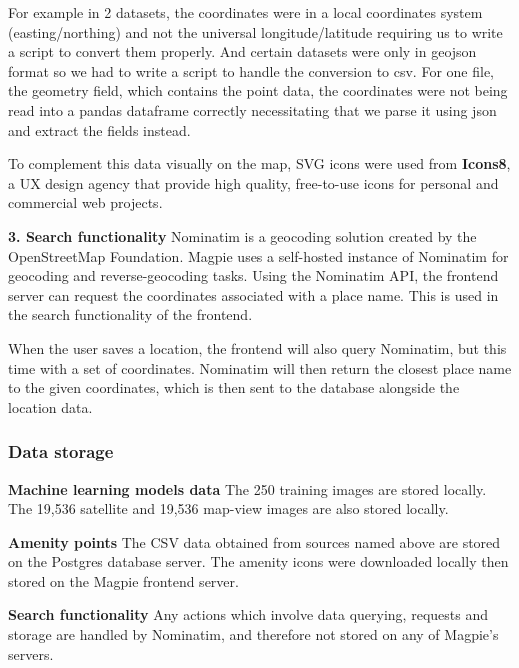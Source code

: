 For example in 2 datasets, the coordinates were in a local coordinates system
(easting/northing) and not the universal longitude/latitude requiring us to
write a script to convert them properly. And certain datasets were only in
geojson format so we had to write a script to handle the conversion to csv. For
one file, the geometry field, which contains the point data, the coordinates
were not being read into a pandas dataframe correctly necessitating that we
parse it using json and extract the fields instead.

To complement this data visually on the map, SVG icons were used from
\textbf{Icons8}, a UX design agency that provide high quality, free-to-use icons
for personal and commercial web projects.

\textbf{3. Search functionality}
Nominatim is a geocoding solution created by the OpenStreetMap Foundation.
Magpie uses a self-hosted instance of Nominatim for geocoding and
reverse-geocoding tasks. Using the Nominatim API, the frontend server can
request the coordinates associated with a place name. This is used in the search
functionality of the frontend.

When the user saves a location, the frontend will also query Nominatim, but this
time with a set of coordinates. Nominatim will then return the closest place
name to the given coordinates, which is then sent to the database alongside the
location data.

\subsubsection{Data storage}
\textbf{Machine learning models data}
The 250 training images are stored locally.
The 19,536 satellite and 19,536 map-view images are also stored locally.

\textbf{Amenity points}
The CSV data obtained from sources named above are stored on the Postgres database server.
The amenity icons were downloaded locally then stored on the Magpie frontend server.

\textbf{Search functionality}
Any actions which involve data querying, requests and storage are handled by
Nominatim, and therefore not stored on any of Magpie's servers.

\newpage{}